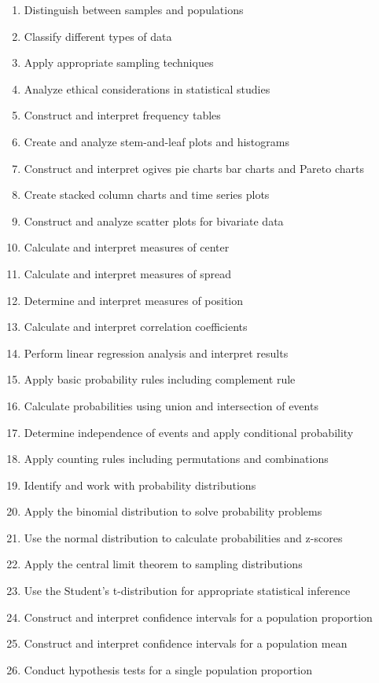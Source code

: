 \documentclass[11pt]{article}
\begin{document}
\begin{enumerate}
\item Distinguish between samples and populations
\item Classify different types of data
\item Apply appropriate sampling techniques
\item Analyze ethical considerations in statistical studies
\item Construct and interpret frequency tables
\item Create and analyze stem-and-leaf plots and histograms
\item Construct and interpret ogives pie charts bar charts and Pareto charts
\item Create stacked column charts and time series plots
\item Construct and analyze scatter plots for bivariate data
\item Calculate and interpret measures of center
\item Calculate and interpret measures of spread
\item Determine and interpret measures of position
\item Calculate and interpret correlation coefficients
\item Perform linear regression analysis and interpret results
\item Apply basic probability rules including complement rule
\item Calculate probabilities using union and intersection of events
\item Determine independence of events and apply conditional probability
\item Apply counting rules including permutations and combinations
\item Identify and work with probability distributions
\item Apply the binomial distribution to solve probability problems
\item Use the normal distribution to calculate probabilities and z-scores
\item Apply the central limit theorem to sampling distributions
\item Use the Student's t-distribution for appropriate statistical inference
\item Construct and interpret confidence intervals for a population proportion
\item Construct and interpret confidence intervals for a population mean
\item Conduct hypothesis tests for a single population proportion

\end{enumerate}
\end{document}
